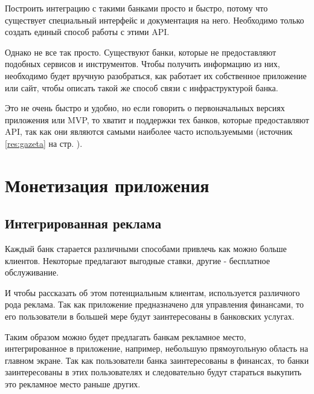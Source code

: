 \documentclass[a4paper,12pt]{article}
\begin{document}
    Построить интеграцию с такими банками просто и быстро, потому что
    существует специальный интерфейс и документация на него. Необходимо
    только создать единый способ работы с этими API.

    Однако не все так просто. Существуют банки, которые не предоставляют
    подобных сервисов и инструментов. Чтобы получить информацию из
    них, необходимо будет вручную разобраться, как работает их
    собственное приложение или сайт, чтобы описать такой же способ
    связи с инфраструктурой банка.

    Это не очень быстро и удобно, но если говорить о первоначальных
    версиях приложения или MVP, то хватит и поддержки тех банков,
    которые предоставляют API, так как они являются самыми
    наиболее часто используемыми (источник \ref{res:gazeta}
    на стр. \pageref{res:gazeta}).


    \section{Монетизация приложения}

    \subsection{Интегрированная реклама}

    Каждый банк старается различными способами привлечь как
    можно больше клиентов. Некоторые предлагают выгодные ставки,
    другие - бесплатное обслуживание.

    И чтобы рассказать об этом потенциальным клиентам, используется
    различного рода реклама. Так как приложение предназначено для
    управления финансами, то его пользователи в большей мере будут
    заинтересованы в банковских услугах.

    Таким образом можно будет предлагать банкам рекламное место,
    интегрированное в приложение, например, небольшую прямоугольную
    область на главном экране. Так как пользователи банка заинтересованы
    в финансах, то банки заинтересованы в этих пользователях и 
    следовательно будут стараться выкупить это рекламное место раньше
    других.
\end{document}
